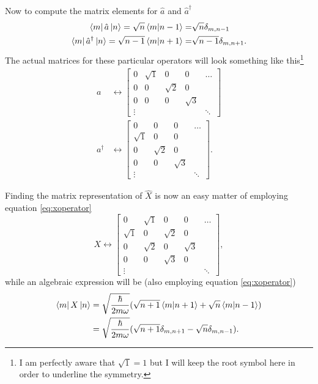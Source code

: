 \documentclass{article}
\begin{document}
Now to compute the matrix elements for $\hat{a}$ and $\hat{a}^{\dagger}$
\begin{align}
\bra{m}\hat{a}\ket{n}=\sqrt{n}\braket{m}{n-1}=&\sqrt{n}\delta_{m,n-1} \\
\bra{m}\hat{a}^{\dagger}\ket{n}=\sqrt{n-1}\braket{m}{n+1}=&\sqrt{n-1}\delta_{m,n+1}.
\end{align}
The actual matrices for these particular operators will look something like this\footnote{I am perfectly aware that $\sqrt{1}=1$ but I will keep the root symbol here in order to underline the symmetry.}
\begin{align}
a &\leftrightarrow \begin{bmatrix}
0 & \sqrt{1} & 0 & 0 & \dots \\
0 & 0 & \sqrt{2} & 0 &  \\
0 & 0 & 0 & \sqrt{3} & \\
\vdots & & & & \ddots 
\end{bmatrix} \\
a^{\dagger} &\leftrightarrow \begin{bmatrix}
0 & 0 & 0 & \dots \\
\sqrt{1} & 0 & 0 & \\
0 & \sqrt{2} & 0 & \\
0 & 0 & \sqrt{3} & \\
\vdots & & & \ddots 
\end{bmatrix}.
\end{align}

Finding the matrix representation of $\hat{X}$ is now an easy matter of employing equation \ref{eq:xoperator}
\begin{equation}
X \leftrightarrow  \begin{bmatrix}
0 & \sqrt{1} & 0 & 0 & \dots \\
\sqrt{1} & 0 & \sqrt{2} & 0 &  \\
0 & \sqrt{2} & 0 & \sqrt{3} & \\
0 & 0 & \sqrt{3} & 0 \\
\vdots & & & & \ddots 
\end{bmatrix},
\end{equation}
while an algebraic expression will  be (also employing equation \ref{eq:xoperator})
\begin{align}
\bra{m}X\ket{n} &= \sqrt{\frac{\hbar}{2m\omega}}(\sqrt{n+1}\braket{m}{n+1}+\sqrt{n}\braket{m}{n-1}) \\
&= \sqrt{\frac{\hbar}{2m\omega}}(\sqrt{n+1}\delta_{m,n+1}-\sqrt{n}\delta_{m,n-1}).
\end{align}
\end{document}
